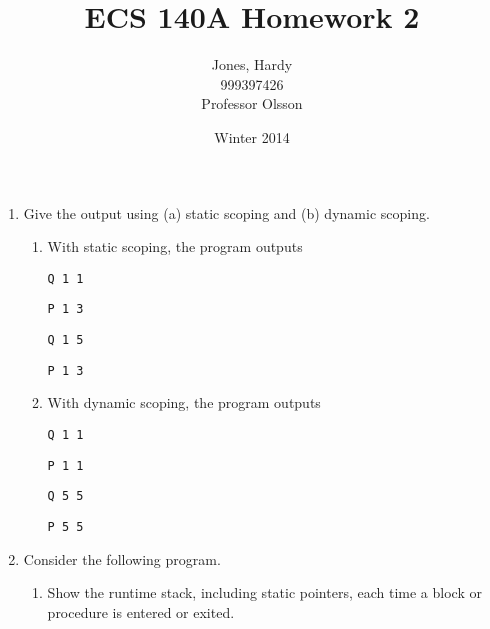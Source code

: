 \documentclass[12pt,letterpaper]{article}
\title{ECS 140A Homework 2\vspace{-2ex}}
\author{Jones, Hardy\\
        999397426\\
        Professor Olsson\vspace{-2ex}}
\date{Winter 2014}
\begin{document}
  \maketitle

  \begin{enumerate}
    \item Give the output using (a) static scoping and (b) dynamic scoping.

    \begin{enumerate}
      \item
        With static scoping, the program outputs

        \texttt{Q 1 1}

        \texttt{P 1 3}

        \texttt{Q 1 5}

        \texttt{P 1 3}

      \item
        With dynamic scoping, the program outputs

        \texttt{Q 1 1}

        \texttt{P 1 1}

        \texttt{Q 5 5}

        \texttt{P 5 5}

    \end{enumerate}

    \pagebreak

    \item Consider the following program.
      \begin{enumerate}
        \item Show the runtime stack, including static pointers,
          each time a block or procedure is entered or exited.


\end{enumerate}
\end{enumerate}
\end{document}
